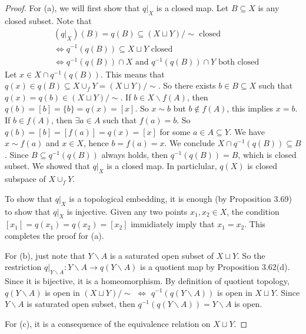 \documentclass[a4paper]{article}
\theoremstyle{remark}
\newcommand{\subhim}{\subseteq} %
\begin{document}
\begin{proof}
	For (a), we will first show that $q|_X$ is a closed map. Let $B \subhim X$ is any closed subset. Note that
	\begin{align*}
	&(q|_X)(B) = q(B)\subhim (X\sqcup Y)/{\sim} \text{ closed }\\ &\Leftrightarrow q^{-1}(q(B)) \subhim X \sqcup Y \text{ closed} \\ &\Leftrightarrow q^{-1}(q(B)) \cap X \text{ and } q^{-1}(q(B)) \cap Y \text{ both closed}
	\end{align*}
	Let $x \in X \cap q^{-1}(q(B))$. This means that $q(x) \in q(B) \subhim X \cup_f Y = (X \sqcup Y)/{\sim}$. So there exists $b \in B\subhim X$ such that $q(x) = q(b) \in (X \sqcup Y)/{\sim}$. If $b \in X \smallsetminus f(A)$, then $q(b)=[b] = \{b\} = q(x) = [x]$. So $x {\sim} b$ but $b \notin f(A)$, this implies $x=b$. If $b \in f(A)$, then $\exists a \in A$ such that $f(a) = b$. So  $q(b) = [b]=[f(a)] =q(x) = [x]$ for some $a \in A \subhim Y$. We have $x {\sim} f(a)$ and  $x \in X$, hence $b = f(a) = x$. We conclude $X \cap q^{-1}(q(B)) \subhim B$. Since $B \subhim q^{-1}(q(B))$ always holds, then $q^{-1}(q(B)) = B$, which is closed subset. We showed that $q|_X$ is a closed map. In particlular, $q(X)$ is closed subspace of $X \cup_f Y$.
	
	To show that $q|_X$ is a topological embedding, it is enough (by Proposition 3.69) to show that $q|_X$ is injective. Given any two points $x_1,x_2 \in X$, the condition $[x_1] = q(x_1) = q(x_2) = [x_2]$ immidiately imply that $x_1=x_2$. This completes the proof for (a).
	
	 For (b), just note that $Y \smallsetminus A$ is a saturated open subset of $X \sqcup Y$. So the restriction $q|_{Y \smallsetminus A} : Y \smallsetminus A \to q(Y \smallsetminus A)$ is a quotient map by Proposition 3.62(d). Since it is bijective, it is a homeomorphism. By definition of quotient topology, $q(Y \smallsetminus A)$ is open in $(X \sqcup Y)/{\sim}$ $\Leftrightarrow$ $q^{-1}(q(Y \smallsetminus A))$ is open in $X \sqcup Y$. Since $Y \smallsetminus A$ is saturated open subset, then $q^{-1}(q(Y \smallsetminus A)) = Y \smallsetminus A$ is open.
	
	For (c), it is a consequence of the equivalence relation on $X \sqcup Y$.
\end{proof}
\end{document}
